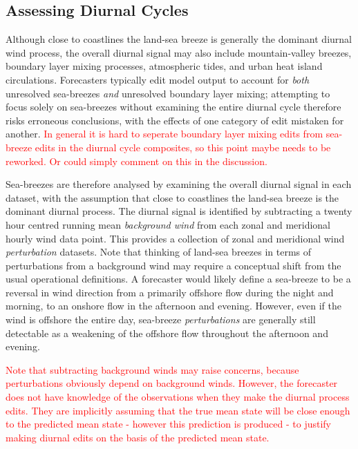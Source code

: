 \documentclass{ametsoc}
\begin{document}
\subsection{Assessing Diurnal Cycles}
Although close to coastlines the land-sea breeze is generally the dominant diurnal wind process, the overall diurnal signal may also include mountain-valley breezes, boundary layer mixing processes, atmospheric tides, and urban heat island circulations. Forecasters typically edit model output to account for \emph{both} unresolved sea-breezes \emph{and} unresolved boundary layer mixing; attempting to focus solely on sea-breezes without examining the entire diurnal cycle therefore risks erroneous conclusions, with the effects of one category of edit mistaken for another. \textcolor{red}{In general it is hard to seperate boundary layer mixing edits from sea-breeze edits in the diurnal cycle composites, so this point maybe needs to be reworked. Or could simply comment on this in the discussion.}   

Sea-breezes are therefore analysed by examining the overall diurnal signal in each dataset, with the assumption that close to coastlines the land-sea breeze is the dominant diurnal process. The diurnal signal is identified by subtracting a twenty hour centred running mean \textit{background wind} from each zonal and meridional hourly wind data point. This provides a collection of zonal and meridional wind \emph{perturbation} datasets. Note that thinking of land-sea breezes in terms of perturbations from a background wind may require a conceptual shift from the usual operational definitions. A forecaster would likely define a sea-breeze to be a reversal in wind direction from a primarily offshore flow during the night and morning, to an onshore flow in the afternoon and evening. However, even if the wind is offshore the entire day, sea-breeze \emph{perturbations} are generally still detectable as a weakening of the offshore flow throughout the afternoon and evening.

\textcolor{red}{Note that subtracting background winds may raise concerns, because perturbations obviously depend on background winds. However, the forecaster does not have knowledge of the observations when they make the diurnal process edits. They are implicitly assuming that the true mean state will be close enough to the predicted mean state - however this prediction is produced - to justify making diurnal edits on the basis of the predicted mean state.} 
\end{document}
